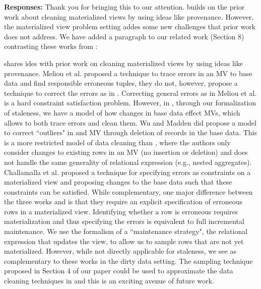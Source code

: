 {\bf Responses:} Thank you for bringing this to our attention.
\svc builds on the prior work about cleaning materialized views by using ideas like provenance.
However, the materialized view problem setting addes some new challenges that prior work does not address.
We have added a paragraph to our related work (Section 8) contrasting these works from \svc:
\begin{displayquote}
\svc shares ides with prior work on cleaning materialized views by using ideas like provenance.
Meliou et al. \cite{DBLP:conf/sigmod/MeliouGNS11} proposed a technique to trace errors in an MV to base data and find responsible erroneous tuples, they do not, however, propose a technique to correct the errors as in \svc.
Correcting general errors as in Meliou et al. is a hard constraint satisfaction problem.
However, in \svc, through our formalization of staleness, we have a model of how changes in base data effect MVs, which allows to both trace errors and clean them.
Wu and Madden \cite{DBLP:journals/pvldb/0002M13} did propose a model to correct ``outliers" in and MV through deletion of records in the base data.
This is a more restricted model of data cleaning than \svc, where the authors only consider changes to existing rows in an MV (no insertion or deletion) and does not handle the same generality of relational expression (e.g., nested aggregates).
Challamalla et al. \cite{DBLP:conf/sigmod/ChalamallaIOP14} proposed a technique for specifying errors as constraints on a materialized view and proposing changes to the base data such that these constraints can be satisfied.
While complementary, one major difference between the three works \cite{DBLP:conf/sigmod/MeliouGNS11, DBLP:journals/pvldb/0002M13, DBLP:conf/sigmod/ChalamallaIOP14} and \svc is that they require an explicit specification of erroneous rows in a materialized view.
Identifying whether a row is erroneous requires materialization and thus specifying the errors is equivalent to full incremental maintenance. 
We use the formalism of a ``maintenance strategy", the relational expression that updates the view, to allow us to sample rows that are not yet materialized.
However, while not directly applicable for staleness, we see \svc as complementary to these works in the dirty data setting. 
The sampling technique proposed in Section 4 of our paper could be used to approximate the data cleaning techniques in \cite{DBLP:conf/sigmod/MeliouGNS11, DBLP:journals/pvldb/0002M13, DBLP:conf/sigmod/ChalamallaIOP14} and this is an exciting avenue of future work.\end{displayquote}

